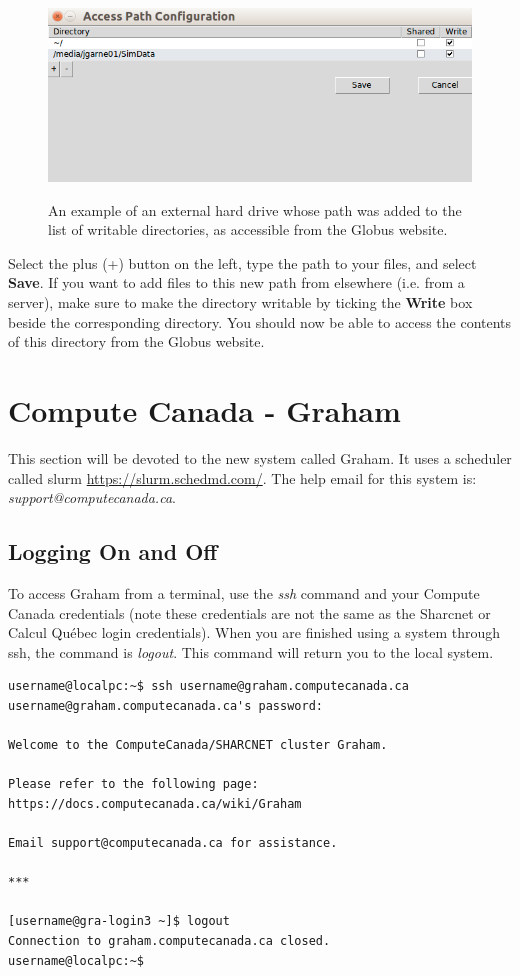 \documentclass[12pt]{article}
\begin{document}
\begin{figure}[H]
\centering
\caption{An example of an external hard drive whose path was added to the list of writable directories, as accessible from the Globus website.}
\includegraphics[width=.8\textwidth]{globus-addusb}
\label{globus-add}
\end{figure}

\quad Select the plus (+) button on the left, type the path to your files, and select \textbf{Save}. If you want to add files to this new path from elsewhere (i.e. from a server), make sure to make the directory writable by ticking the \textbf{Write} box beside the corresponding directory. You should now be able to access the contents of this directory from the Globus website.

\section{Compute Canada - Graham}\label{CompC}
\quad\enskip\quad This section will be devoted to the new system called Graham. It uses a scheduler called slurm \url{https://slurm.schedmd.com/}. The help email for this system is: \textit{support@computecanada.ca}. 

\subsection{Logging On and Off}

\quad To access Graham from a terminal, use the \textit{ssh} command and your Compute Canada credentials (note these credentials are not the same as the Sharcnet or Calcul Qu\'{e}bec login credentials). When you are finished using a system through ssh, the command is \textit{logout}. This command will return you to the local system.

\begin{lstlisting}[numbers=none]
username@localpc:~$ ssh username@graham.computecanada.ca
username@graham.computecanada.ca's password: 

Welcome to the ComputeCanada/SHARCNET cluster Graham.

Please refer to the following page:
https://docs.computecanada.ca/wiki/Graham

Email support@computecanada.ca for assistance.

***

[username@gra-login3 ~]$ logout 
Connection to graham.computecanada.ca closed.
username@localpc:~$ 

\end{lstlisting}
\end{document}
